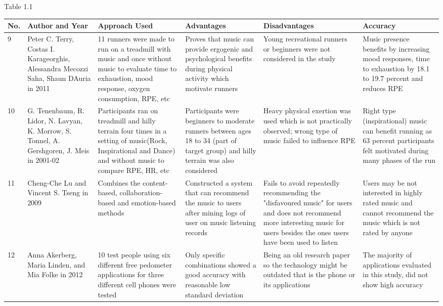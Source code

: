 \documentclass[10pt, a4paper]{article}
\begin{document}
\begin{landscape}
\begin{center}
Table 1.1
\bigbreak
\begin{tabular}{ | m{0.5cm} | m{3.5cm}| m{5cm} | m{4.5cm}| m{5cm}| m{5.5cm}|} 
\hline \hline
No. & Author and Year & Approach Used & Advantages & Disadvantages & Accuracy\\ 
\hline
\hline
9 & Peter C. Terry, Costas I. Karageorghis, Alessandra Mecozzi Saha, Shaun DAuria in 2011 & 11 runners were made to run on a treadmill with music and once without music to evaluate time to exhaustion, mood response, oxygen consumption, RPE, etc & Proves that music can provide ergogenic and psychological benefits during physical activity which motivate runners & Young recreational runners or beginners were not considered in the study & Music presence benefits by increasing mood responses, time to exhaustion by 18.1 to 19.7 percent and reduces RPE \\ 
\hline
10 & G. Tenenbaum, R. Lidor, N. Lavyan, K. Morrow, S. Tonnel, A. Gershgoren, J. Meis in 2001-02 & Participants ran on treadmill and hilly terrain four times in a setting of music(Rock, Inspirational and Dance) and without music  to compare RPE, HR, etc & Participants were beginners to moderate runners between ages 18 to 34 (part of target group) and hilly terrain was also considered & Heavy physical exertion was used which is not practically observed; wrong type of music failed to influence RPE & Right type (inspirational) music can benefit running as 63 percent participants felt motivated during many phases of the run \\ 
\hline
11 & Cheng-Che Lu and Vincent S. Tseng in 2009 & Combines the content-based, collaboration-based and emotion-based methods & Constructed a system that can recommend the music to users after mining logs of user on music listening records & 
Fails to avoid repeatedly recommending the "disfavoured music" for users and does not  recommend more interesting music for users besides the ones users have been used to listen & Users may be not interested in highly rated music and cannot recommend the music which is not rated by anyone\\ 
\hline
12 & Anna Akerberg, Maria Linden, and Mia Folke in 2012 & 10 test people using six different free pedometer applications for three different cell phones were tested &  Only specific combinations showed a good accuracy with reasonable low standard deviation & Being an old research paper so the technology might be outdated that is the phone or its applications & The majority of applications evaluated in this study, did not show high accuracy\\ 

\end{tabular}
\end{center}
\end{landscape}
\end{document}
